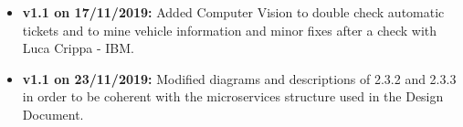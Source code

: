 \begin{itemize}
\item \textbf{v1.1 on 17/11/2019:} Added Computer Vision to double check automatic tickets and to mine vehicle information and minor fixes after a check with Luca Crippa - IBM.
\item \textbf{v1.1 on 23/11/2019:} Modified diagrams and descriptions of 2.3.2 and 2.3.3 in order to be coherent with the microservices structure used in the Design Document.
\end{itemize}